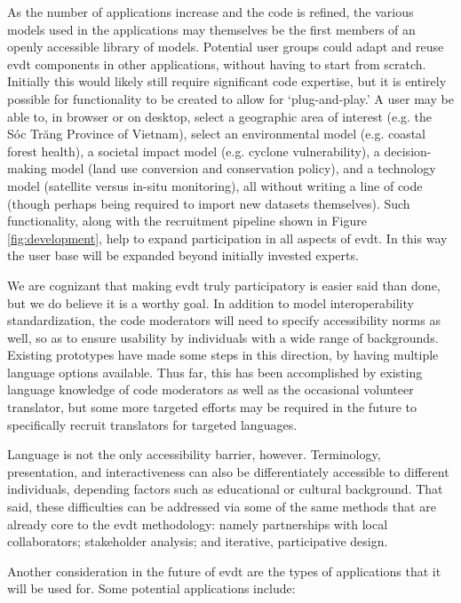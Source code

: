 As the number of applications increase and the code is refined, the various models used in the applications may themselves be the first members of an openly accessible library of models. Potential user groups could adapt and reuse \ac{evdt} components in other applications, without having to start from scratch. Initially this would likely still require significant code expertise, but it is entirely possible for functionality to be created to allow for `plug-and-play.' A user may be able to, in browser or on desktop, select a geographic area of interest (e.g. the Sóc Trăng Province of Vietnam), select an environmental model (e.g. coastal forest health), a societal impact model (e.g. cyclone vulnerability), a decision-making model (land use conversion and conservation policy), and a technology model (satellite versus in-situ monitoring), all without writing a line of code (though perhaps being required to import new datasets themselves). Such functionality, along with the recruitment pipeline shown in Figure \ref{fig:development}, help to expand participation in all aspects of \ac{evdt}. In this way the user base will be expanded beyond initially invested experts.

We are cognizant that making \ac{evdt} truly participatory is easier said than done, but we do believe it is a worthy goal. In addition to model interoperability standardization, the code moderators will need to specify accessibility norms as well, so as to ensure usability by individuals with a wide range of backgrounds. Existing prototypes have made some steps in this direction, by having multiple language options available. Thus far, this has been accomplished by existing language knowledge of code moderators as well as the occasional volunteer translator, but some more targeted efforts may be required in the future to specifically recruit translators for targeted languages.

Language is not the only accessibility barrier, however. Terminology, presentation, and interactiveness can also be differentiately accessible to different individuals, depending factors such as educational or cultural background. That said, these difficulties can be addressed via some of the same methods that are already core to the \ac{evdt} methodology: namely partnerships with local collaborators; stakeholder analysis; and iterative, participative design. 

Another consideration in the future of \ac{evdt} are the types of applications that it will be used for. Some potential applications include:

